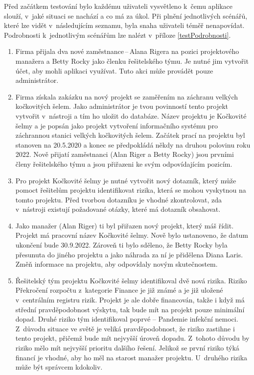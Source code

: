 Před začátkem testování bylo každému uživateli vysvětleno k~čemu aplikace slouží, v~jaké situaci se nachází a co má za úkol. Při plnění jednotlivých scénářů, které lze vidět v~následujícím seznamu, byla snaha uživateli téměř nenapovídat. Podrobnosti k~jednotlivým scénářům lze nalézt v~příloze \ref{testPodrobnosti}.

\begin{enumerate}
    \item Firma přijala dva nové zaměstnance\,--\,Alana Rigera na pozici projektového manažera a Betty Rocky jako členku řešitelského týmu. Je nutné jim vytvořit účet, aby mohli aplikaci využívat. Tuto akci může provádět pouze administrátor.
    \item Firma získala zakázku na nový projekt se zaměřením na záchranu velkých kočkovitých šelem. Jako administrátor je tvou povinností tento projekt vytvořit v~nástroji a tím ho uložit do databáze. Název projektu je Kočkovité šelmy a je popsán jako projekt vytvoření informačního systému pro záchrannou stanici velkých kočkovitých šelem. Začátek prací na projektu byl stanoven na 20.5.2020 a konec se předpokládá někdy na druhou polovinu roku 2022. Nově přijatí zaměstnanci (Alan Riger a Betty Rocky) jsou prvními členy řešitelského týmu a jsou přiřazeni ke svým odpovídajícím pozicím.
    \item Pro projekt Kočkovité šelmy je nutné vytvořit nový dotazník, který může pomoct řešitelům projektu identifikovat rizika, která se mohou vyskytnou na tomto projektu. Před tvorbou dotazníku je vhodné zkontrolovat, zda v~nástroji existují požadované otázky, které má dotazník obsahovat.
    \item Jako manažer (Alan Riger) ti byl přiřazen nový projekt, který máš řídit. Projekt má pracovní název Kočkovité šelmy. Nově bylo ustanoveno, že datum ukončení bude 30.9.2022. Zároveň ti bylo sděleno, že Betty Rocky byla přesunuta do jiného projektu a jako náhrada za ní je přidělena Diana Laris. Změň informace na projektu, aby odpovídaly novým skutečnostem.
    \item Řešitelský tým projektu Kočkovité šelmy identifikoval dvě nová rizika. Riziko Překročení rozpočtu z~kategorie Finance je již známé a je již uložené v~centrálním registru rizik. Projekt je ale dobře financován, takže i když má střední pravděpodobnost výskytu, tak bude mít na projekt pouze minimální dopad. Druhé riziko tým identifikoval poprvé – Pandemie infekční nemoci. Z~důvodu situace ve světě je veliká pravděpodobnost, že riziko zastihne i tento projekt, přičemž bude mít nejvyšší úroveň dopadu. Z~tohoto důvodu by riziko mělo mít nejvyšší prioritu dalšího řešení. Jelikož se první riziko týká financí je vhodné, aby ho měl na starost manažer projektu. U~druhého rizika může být správcem kdokoliv.

\end{enumerate}
